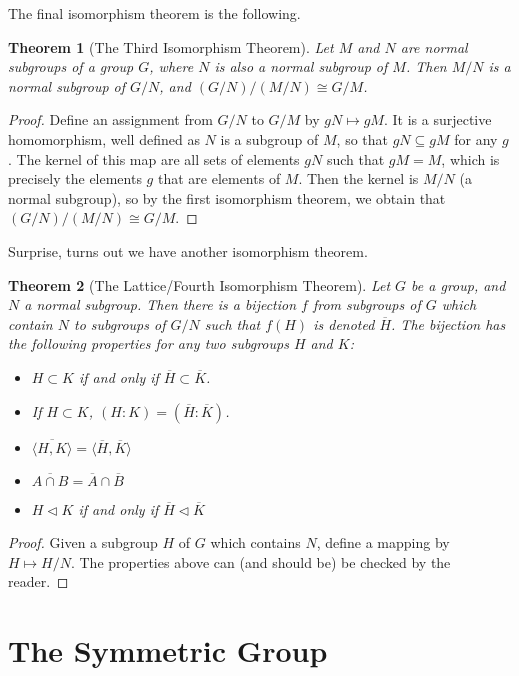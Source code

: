 \documentclass[12pt]{report}
\newtheorem{theorem}{Theorem}[section]
\begin{document}
The final isomorphism theorem is the following.

\begin{theorem}[The Third Isomorphism Theorem]
    Let $M$ and $N$ are normal subgroups of a group $G$, where $N$ is also a normal subgroup of $M$. Then $M/N$ is a normal subgroup of $G/N$, and $(G/N)/(M/N) \cong G/M$.
\end{theorem}
\begin{proof}
    Define an assignment from $G/N$ to $G/M$ by $gN \mapsto gM$. It is a surjective homomorphism, well defined as $N$ is a subgroup of $M$, so that $gN \subseteq gM$ for any $g$. The kernel of this map are all sets of elements $gN$ such that $gM = M$, which is precisely the elements $g$ that are elements of $M$. Then the kernel is $M/N$ (a normal subgroup), so by the first isomorphism theorem, we obtain that $(G/N)/(M/N) \cong G/M$.
\end{proof}

Surprise, turns out we have another isomorphism theorem.

\begin{theorem}[The Lattice/Fourth Isomorphism Theorem]
Let $G$ be a group, and $N$ a normal subgroup. Then there is a bijection $f$ from subgroups of $G$ which contain $N$ to subgroups of $G/N$ such that $f(H)$ is denoted $\overline{H}$. The bijection has the following properties for any two subgroups $H$ and $K$:

\begin{itemize}
    \item $H \subset K$ if and only if $\overline{H} \subset \overline{K}$.
    \item If $H \subset K$, $(H:K) = (\overline{H}:\overline{K})$.
    \item $\overline{\langle H, K \rangle} = \langle \overline{H}, \overline{K} \rangle$
    \item $\overline{A \cap B} = \overline{A} \cap \overline{B}$
    \item $H \lhd K$ if and only if $\overline{H} \lhd \overline{K}$
\end{itemize}
\end{theorem}
\begin{proof}
    Given a subgroup $H$ of $G$ which contains $N$, define a mapping by $H \mapsto H/N$. The properties above can (and should be) be checked by the reader.
\end{proof}

\chapter{The Symmetric Group}
\end{document}
